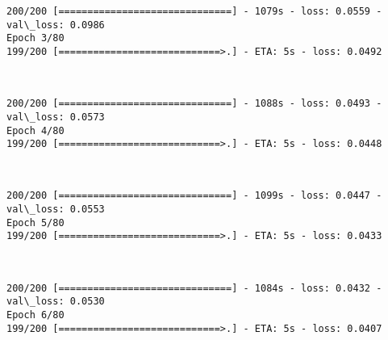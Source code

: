 \documentclass[11pt]{article}
\begin{document}
    \begin{Verbatim}[commandchars=\\\{\}]
200/200 [==============================] - 1079s - loss: 0.0559 - val\_loss: 0.0986
Epoch 3/80
199/200 [============================>.] - ETA: 5s - loss: 0.0492 
    \end{Verbatim}

    \begin{center}
    \end{center}
    { \hspace*{\fill} \\}
    
    \begin{Verbatim}[commandchars=\\\{\}]
200/200 [==============================] - 1088s - loss: 0.0493 - val\_loss: 0.0573
Epoch 4/80
199/200 [============================>.] - ETA: 5s - loss: 0.0448 
    \end{Verbatim}

    \begin{center}
    \end{center}
    { \hspace*{\fill} \\}
    
    \begin{Verbatim}[commandchars=\\\{\}]
200/200 [==============================] - 1099s - loss: 0.0447 - val\_loss: 0.0553
Epoch 5/80
199/200 [============================>.] - ETA: 5s - loss: 0.0433 
    \end{Verbatim}

    \begin{center}
    \end{center}
    { \hspace*{\fill} \\}
    
    \begin{Verbatim}[commandchars=\\\{\}]
200/200 [==============================] - 1084s - loss: 0.0432 - val\_loss: 0.0530
Epoch 6/80
199/200 [============================>.] - ETA: 5s - loss: 0.0407 
    \end{Verbatim}

    \begin{center}
    \end{center}
    { \hspace*{\fill} \\}
    
\end{document}

